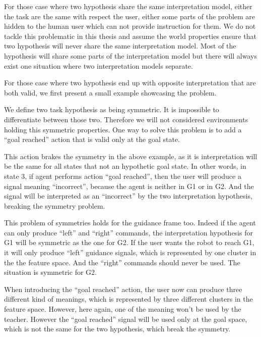 For those case where two hypothesis share the same interpretation model, either the task are the same with respect the user, either some parts of the problem are hidden to the human user which can not provide instruction for them. We do not tackle this problematic in this thesis and assume the world properties ensure that two hypothesis will never share the same interpretation model. Most of the hypothesis will share some parts of the interpretation model but there will always exist one situation where two interpretation models separate.

For those case where two hypothesis end up with opposite interpretation that are both valid, we first present a small example showcasing the problem.


We define two task hypothesis as being symmetric. It is impossible to differentiate between those two. Therefore we will not considered environments holding this symmetric properties. One way to solve this problem is to add a ``goal reached'' action that is valid only at the goal state. 

This action brakes the symmetry in the above example, as it is interpretation will be the same for all states that not an hypothetic goal state. In other words, in state 3, if agent performs action ``goal reached'', then the user will produce a signal meaning ``incorrect'', because the agent is neither in G1 or in G2. And the signal will be interpreted as an ``incorrect'' by the two interpretation hypothesis, breaking the symmetry problem.


This problem of symmetries holds for the guidance frame too. Indeed if the agent can only produce ``left'' and ``right'' commands, the interpretation hypothesis for G1 will be symmetric as the one for G2. If the user wants the robot to reach G1, it will only produce ``left'' guidance signals, which is represented by one cluster in the the feature space. And the ``right'' commands should never be used. The situation is symmetric for G2.


When introducing the ``goal reached'' action, the user now can produce three different kind of meanings, which is represented by three different clusters in the feature space. However, here again, one of the meaning won't be used by the teacher. However the ``goal reached'' signal will be used only at the goal space, which is not the same for the two hypothesis, which break the symmetry.


